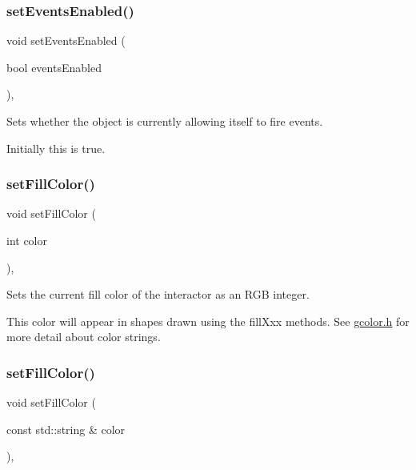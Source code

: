 \subsubsection{\texorpdfstring{set\+Events\+Enabled()}{setEventsEnabled()}}
{\footnotesize\ttfamily void set\+Events\+Enabled (\begin{DoxyParamCaption}\item[{bool}]{events\+Enabled }\end{DoxyParamCaption})\hspace{0.3cm}{\ttfamily [virtual]}, {\ttfamily [inherited]}}



Sets whether the object is currently allowing itself to fire events. 

Initially this is true. \mbox{\label{classGDrawingSurface_a47fad447b715f2f303538434eed26709}} 
\subsubsection{\texorpdfstring{set\+Fill\+Color()}{setFillColor()}\hspace{0.1cm}{\footnotesize\ttfamily [1/2]}}
{\footnotesize\ttfamily void set\+Fill\+Color (\begin{DoxyParamCaption}\item[{int}]{color }\end{DoxyParamCaption})\hspace{0.3cm}{\ttfamily [virtual]}, {\ttfamily [inherited]}}



Sets the current fill color of the interactor as an R\+GB integer. 

This color will appear in shapes drawn using the fill\+Xxx methods. See \mbox{\hyperlink{gcolor_8h_source}{gcolor.\+h}} for more detail about color strings. \mbox{\label{classGDrawingSurface_adbc18b1a930aadd97d7437f9f7265b96}} 
\subsubsection{\texorpdfstring{set\+Fill\+Color()}{setFillColor()}\hspace{0.1cm}{\footnotesize\ttfamily [2/2]}}
{\footnotesize\ttfamily void set\+Fill\+Color (\begin{DoxyParamCaption}\item[{const std\+::string \&}]{color }\end{DoxyParamCaption})\hspace{0.3cm}{\ttfamily [virtual]}, {\ttfamily [inherited]}}



